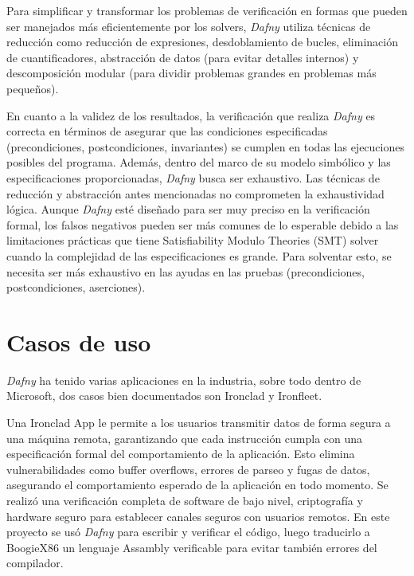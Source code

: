 \documentclass[runningheads]{llncs}
\begin{document}
Para simplificar y transformar los problemas de verificación en formas que pueden ser manejados más eficientemente por los solvers, 
\textit{Dafny} utiliza técnicas de reducción como reducción de expresiones, desdoblamiento de bucles, eliminación de cuantificadores,
abstracción de datos (para evitar detalles internos) y descomposición modular (para dividir problemas grandes en problemas más pequeños).

En cuanto a la validez de los resultados, la verificación que realiza \textit{Dafny} es correcta en términos de asegurar que las condiciones
especificadas (precondiciones, postcondiciones, invariantes) se cumplen en todas las ejecuciones posibles del programa. 
Además, dentro del marco de su modelo simbólico y las especificaciones proporcionadas,
\textit{Dafny} busca ser exhaustivo. Las técnicas de reducción y abstracción antes mencionadas no comprometen la exhaustividad lógica.
Aunque \textit{Dafny} esté diseñado para ser muy preciso en la verificación formal, 
los falsos negativos pueden ser más comunes de lo esperable debido a las limitaciones prácticas que tiene Satisfiability Modulo Theories (SMT) solver
cuando la complejidad de las especificaciones es grande. Para solventar esto, se necesita ser más exhaustivo en las ayudas en las pruebas (precondiciones, postcondiciones, aserciones).

\section{Casos de uso}

\textit{Dafny} ha tenido varias aplicaciones en la industria, sobre todo dentro de Microsoft, dos casos bien documentados son Ironclad y Ironfleet.

Una Ironclad\cite{hawblitzel2014ironclad} App le permite a los usuarios transmitir datos de forma segura a una máquina remota, garantizando que cada instrucción cumpla con una especificación 
formal del comportamiento de la aplicación. Esto elimina vulnerabilidades como buffer overflows, errores de parseo y fugas de datos, asegurando el comportamiento esperado de la aplicación en todo momento.
Se realizó una verificación completa de software de bajo nivel, criptografía y hardware seguro para establecer canales seguros con usuarios remotos.
En este proyecto se usó \textit{Dafny} para escribir y verificar el código, luego traducirlo a BoogieX86 un lenguaje Assambly verificable para evitar también errores del compilador.
\end{document}
